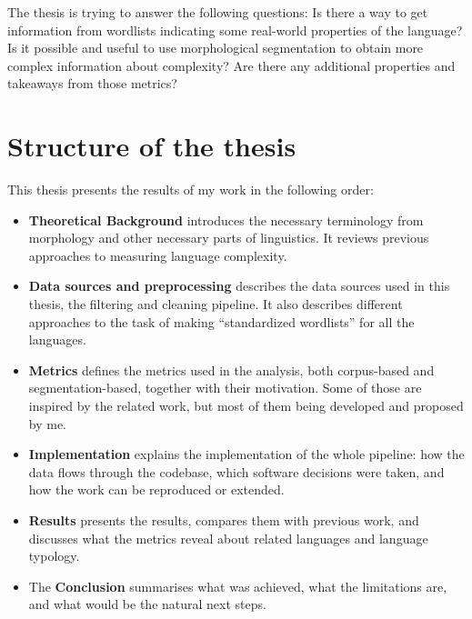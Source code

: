 The thesis is trying to answer the following questions: Is there a way to get information from wordlists indicating some real-world properties of the language? Is it possible and useful to use morphological segmentation to obtain more complex information about complexity? Are there any additional properties and takeaways from those metrics?
\newpage
\section*{Structure of the thesis}

This thesis presents the results of my work in the following order:

\begin{itemize}
    \item \textbf{Theoretical Background} introduces the necessary terminology from morphology and other necessary parts of linguistics. It reviews previous approaches to measuring language complexity.
    \item \textbf{Data sources and preprocessing} describes the data sources used in this thesis, the filtering and cleaning pipeline. It also describes different approaches to the task of making ``standardized wordlists'' for all the languages.
    \item \textbf{Metrics} defines the metrics used in the analysis, both corpus-based and segmentation-based, together with their motivation. Some of those are inspired by the related work, but most of them being developed and proposed by me.
    \item \textbf{Implementation} explains the implementation of the whole pipeline: how the data flows through the codebase, which software decisions were taken, and how the work can be reproduced or extended.
    \item \textbf{Results} presents the results, compares them with previous work, and discusses what the metrics reveal about related languages and language typology.
    \item The \textbf{Conclusion} summarises what was achieved, what the limitations are, and what would be the natural next steps.
\end{itemize}